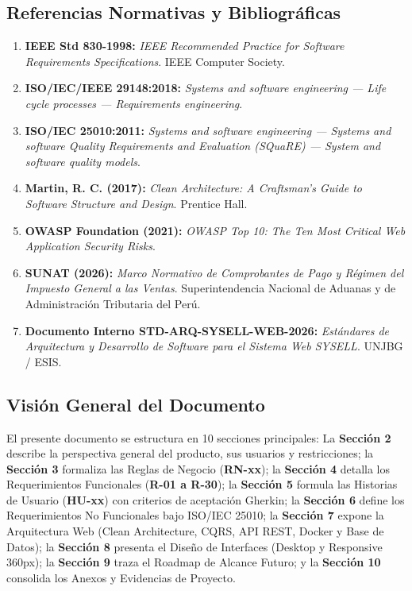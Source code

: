 \subsection{Referencias Normativas y Bibliográficas}
\begin{enumerate}[leftmargin=*]
    \item \textbf{IEEE Std 830-1998:} \textit{IEEE Recommended Practice for Software Requirements Specifications}. IEEE Computer Society.
    \item \textbf{ISO/IEC/IEEE 29148:2018:} \textit{Systems and software engineering --- Life cycle processes --- Requirements engineering}.
    \item \textbf{ISO/IEC 25010:2011:} \textit{Systems and software engineering --- Systems and software Quality Requirements and Evaluation (SQuaRE) --- System and software quality models}.
    \item \textbf{Martin, R. C. (2017):} \textit{Clean Architecture: A Craftsman's Guide to Software Structure and Design}. Prentice Hall.
    \item \textbf{OWASP Foundation (2021):} \textit{OWASP Top 10: The Ten Most Critical Web Application Security Risks}.
    \item \textbf{SUNAT (2026):} \textit{Marco Normativo de Comprobantes de Pago y Régimen del Impuesto General a las Ventas}. Superintendencia Nacional de Aduanas y de Administración Tributaria del Perú.
    \item \textbf{Documento Interno STD-ARQ-SYSELL-WEB-2026:} \textit{Estándares de Arquitectura y Desarrollo de Software para el Sistema Web SYSELL}. UNJBG / ESIS.
\end{enumerate}

\subsection{Visión General del Documento}
El presente documento se estructura en 10 secciones principales:
La \textbf{Sección 2} describe la perspectiva general del producto, sus usuarios y restricciones; la \textbf{Sección 3} formaliza las Reglas de Negocio (\textbf{RN-xx}); la \textbf{Sección 4} detalla los Requerimientos Funcionales (\textbf{R-01 a R-30}); la \textbf{Sección 5} formula las Historias de Usuario (\textbf{HU-xx}) con criterios de aceptación Gherkin; la \textbf{Sección 6} define los Requerimientos No Funcionales bajo ISO/IEC 25010; la \textbf{Sección 7} expone la Arquitectura Web (Clean Architecture, CQRS, API REST, Docker y Base de Datos); la \textbf{Sección 8} presenta el Diseño de Interfaces (Desktop y Responsive 360px); la \textbf{Sección 9} traza el Roadmap de Alcance Futuro; y la \textbf{Sección 10} consolida los Anexos y Evidencias de Proyecto.
